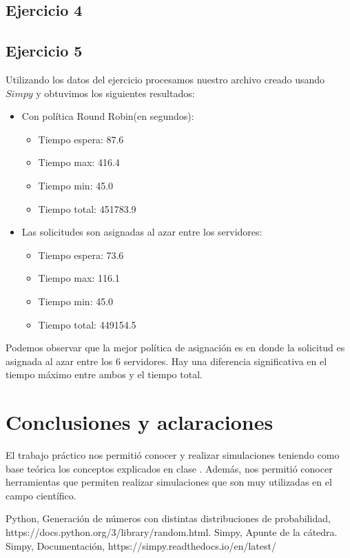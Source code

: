 \documentclass[11pt,a4paper]{article}
\begin{document}
		

	\subsection{Ejercicio 4}

	\subsection{Ejercicio 5}
		Utilizando los datos del ejercicio procesamos nuestro archivo creado usando $Simpy$ y obtuvimos los siguientes resultados:
		\begin{itemize}
			\item Con política Round Robin(en segundos):
				\begin{itemize}
					\item Tiempo espera: 87.6
					\item Tiempo max: 416.4
					\item Tiempo min: 45.0
					\item Tiempo total: 451783.9
				\end{itemize}
			\item Las solicitudes son asignadas al azar entre los servidores:
				\begin{itemize}
					\item Tiempo espera: 73.6
					\item Tiempo max: 116.1
					\item Tiempo min: 45.0
					\item Tiempo total: 449154.5
				\end{itemize}
		\end{itemize}

		Podemos observar que la mejor política de asignación es en donde la solicitud es asignada al azar entre los 6 servidores. Hay una diferencia significativa en el tiempo máximo entre ambos y el tiempo total.

\section{Conclusiones y aclaraciones}
El trabajo práctico nos permitió conocer y realizar simulaciones teniendo como base teórica los conceptos explicados en clase . Además, nos permitió conocer herramientas que permiten realizar simulaciones que son muy utilizadas en el campo científico.

\begin{thebibliography}{10}
	\bibitem{} Python, Generación de números con distintas distribuciones de probabilidad, https://docs.python.org/3/library/random.html.
	\bibitem{} Simpy, Apunte de la cátedra.
	\bibitem{} Simpy, Documentación, https://simpy.readthedocs.io/en/latest/
	

\end{thebibliography}
\end{document}
